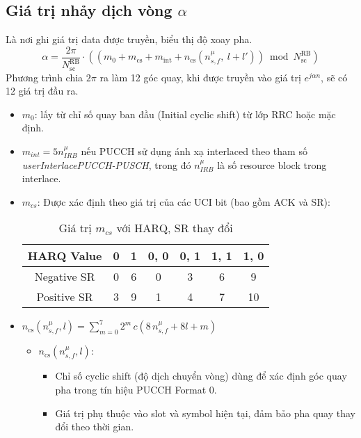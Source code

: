 \subsection{Giá trị nhảy dịch vòng $\alpha$}
Là nơi ghi giá trị data được truyền, biểu thị độ xoay pha. \[\alpha = \frac{2\pi}{N^{\text{RB}}_{\text{sc}}} \cdot (( m_0 + m_{\text{cs}} + m_{\text{int}} + n_{\text{cs}}(n^{\mu}_{s,f},\ l + l')  ) \bmod N^{\text{RB}}_{\text{sc}})
\]
Phương trình chia $2\pi$ ra làm 12 góc quay, khi được truyền vào giá trị $e^{j\alpha n}$, sẽ có 12 giá trị đầu ra.
\begin{itemize}
    \item $m_0$: lấy từ chỉ số quay ban đầu (Initial cyclic shift) từ lớp RRC hoặc mặc định.
    \item $m_{int}= 5n_{IRB}^{\mu}$ nếu PUCCH sử dụng ánh xạ interlaced theo tham số \textit{userInterlacePUCCH-PUSCH}, trong đó $n_{IRB}^{\mu}$ là số resource block trong interlace.
    \item $m_{cs}$: Được xác định theo giá trị của các UCI bit (bao gồm ACK và SR):  
        \begin{table}[H]
            \centering
            \begin{tabular}{|c|c|c|c|c|c|c|}
                 \hline
                 HARQ Value& 0 & 1 & 0, 0 & 0, 1 & 1, 1 & 1, 0\\\hline
                 Negative SR& 0 & 6 & 0 & 3 & 6 & 9\\\hline
                 Positive SR& 3 & 9 & 1 & 4 & 7 & 10\\ \hline
            \end{tabular}
            \caption{Giá trị $m_{cs} $ với HARQ, SR thay đổi}
            \label{tab:mcs}
        \end{table}
        
    \item $n_{\text{cs}}(n_{s,f}^\mu, l) = \sum_{m=0}^{7} 2^{m} \, c\left(8 \, n_{s,f}^\mu + 8l + m \right)$
            \begin{itemize}
          \item \( n_{\text{cs}}(n_{s,f}^\mu, l) \):
          \begin{itemize}
            \item Chỉ số cyclic shift (độ dịch chuyển vòng) dùng để xác định góc quay pha trong tín hiệu PUCCH Format 0.
            \item Giá trị phụ thuộc vào slot và symbol hiện tại, đảm bảo pha quay thay đổi theo thời gian.
          \end{itemize}
        

\end{itemize}
\end{itemize}
